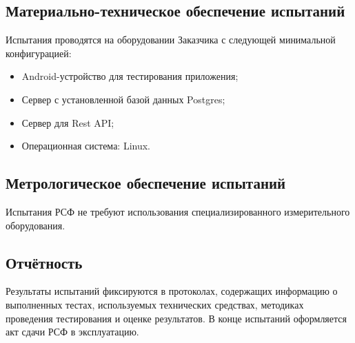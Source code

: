 \subsection{Материально-техническое обеспечение испытаний}

Испытания проводятся на оборудовании Заказчика с следующей минимальной конфигурацией:

\begin{itemize}
	\item Android-устройство для тестирования приложения;
	\item Сервер с установленной базой данных Postgres;
	\item Сервер для Rest API;
	\item Операционная система: Linux.
\end{itemize}

\subsection{Метрологическое обеспечение испытаний}

Испытания РСФ не требуют использования специализированного измерительного оборудования.

\subsection{Отчётность}

Результаты испытаний фиксируются в протоколах, содержащих информацию о выполненных тестах, используемых технических средствах, методиках проведения тестирования и оценке результатов. В конце испытаний оформляется акт сдачи РСФ в эксплуатацию.

\clearpage


